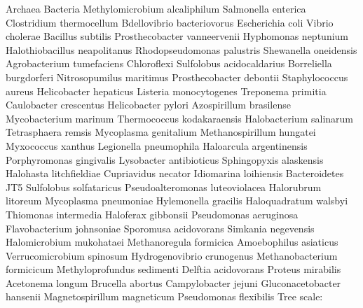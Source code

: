 \documentclass[]{tufte-book}
\begin{document}
 Archaea Bacteria Methylomicrobium alcaliphilum Salmonella enterica
Clostridium thermocellum Bdellovibrio bacteriovorus Escherichia coli
Vibrio cholerae Bacillus subtilis Prosthecobacter vanneervenii
Hyphomonas neptunium Halothiobacillus neapolitanus Rhodopseudomonas
palustris Shewanella oneidensis Agrobacterium tumefaciens Chloroflexi
Sulfolobus acidocaldarius Borreliella burgdorferi Nitrosopumilus
maritimus Prosthecobacter debontii Staphylococcus aureus Helicobacter
hepaticus Listeria monocytogenes Treponema primitia Caulobacter
crescentus Helicobacter pylori Azospirillum brasilense Mycobacterium
marinum Thermococcus kodakaraensis Halobacterium salinarum Tetrasphaera
remsis Mycoplasma genitalium Methanospirillum hungatei Myxococcus
xanthus Legionella pneumophila Haloarcula argentinensis Porphyromonas
gingivalis Lysobacter antibioticus Sphingopyxis alaskensis Halohasta
litchfieldiae Cupriavidus necator Idiomarina loihiensis Bacteroidetes
JT5 Sulfolobus solfataricus Pseudoalteromonas luteoviolacea Halorubrum
litoreum Mycoplasma pneumoniae Hylemonella gracilis Haloquadratum
walsbyi Thiomonas intermedia Haloferax gibbonsii Pseudomonas aeruginosa
Flavobacterium johnsoniae Sporomusa acidovorans Simkania negevensis
Halomicrobium mukohataei Methanoregula formicica Amoebophilus asiaticus
Verrucomicrobium spinosum Hydrogenovibrio crunogenus Methanobacterium
formicicum Methyloprofundus sedimenti Delftia acidovorans Proteus
mirabilis Acetonema longum Brucella abortus Campylobacter jejuni
Gluconacetobacter hansenii Magnetospirillum magneticum Pseudomonas
flexibilis Tree scale:
\end{document}
